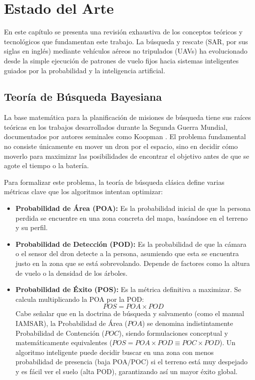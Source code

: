 \chapter{Estado del Arte}

En este capítulo se presenta una revisión exhaustiva de los conceptos teóricos y tecnológicos que fundamentan este trabajo. La búsqueda y rescate (SAR, por sus siglas en inglés) mediante vehículos aéreos no tripulados (UAVs) ha evolucionado desde la simple ejecución de patrones de vuelo fijos hacia sistemas inteligentes guiados por la probabilidad y la inteligencia artificial.

\section{Teoría de Búsqueda Bayesiana}
\label{sec:teoria_busqueda_bayesiana}

La base matemática para la planificación de misiones de búsqueda tiene sus raíces teóricas en los trabajos desarrollados durante la Segunda Guerra Mundial, documentados por autores seminales como Koopman \cite{koopman1980}. El problema fundamental no consiste únicamente en mover un dron por el espacio, sino en decidir cómo moverlo para maximizar las posibilidades de encontrar el objetivo antes de que se agote el tiempo o la batería.

Para formalizar este problema, la teoría de búsqueda clásica define varias métricas clave que los algoritmos intentan optimizar:
\begin{itemize}
    \item \textbf{Probabilidad de Área (POA):} Es la probabilidad inicial de que la persona perdida se encuentre en una zona concreta del mapa, basándose en el terreno y su perfil.
    \item \textbf{Probabilidad de Detección (POD):} Es la probabilidad de que la cámara o el sensor del dron detecte a la persona, asumiendo que esta se encuentra justo en la zona que se está sobrevolando. Depende de factores como la altura de vuelo o la densidad de los árboles.
    \item \textbf{Probabilidad de Éxito (POS):} Es la métrica definitiva a maximizar. Se calcula multiplicando la POA por la POD:
    \begin{equation}
        POS = POA \times POD
    \end{equation}
    Cabe señalar que en la doctrina de búsqueda y salvamento (como el manual IAMSAR), la Probabilidad de Área ($POA$) se denomina indistintamente Probabilidad de Contención ($POC$), siendo formulaciones conceptual y matemáticamente equivalentes ($POS = POA \times POD \equiv POC \times POD$). Un algoritmo inteligente puede decidir buscar en una zona con menos probabilidad de presencia (baja POA/POC) si el terreno está muy despejado y es fácil ver el suelo (alta POD), garantizando así un mayor éxito global.
\end{itemize}

